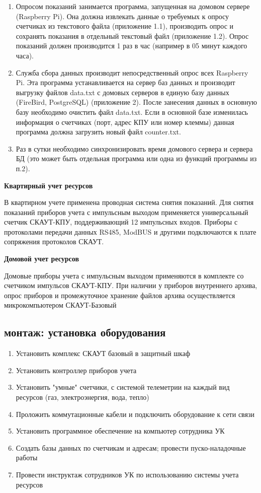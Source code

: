 \begin{enumerate}
	\item Опросом показаний занимается программа, запущенная на домовом сервере (Raspberry Pi).  Она должна извлекать данные о требуемых к опросу счетчиках из текстового файла (приложение 1.1), производить опрос и сохранять показания в отдельный текстовый файл (приложение 1.2). Опрос показаний должен производится 1 раз  в час (например в 05 минут каждого часа).
	\item Служба сбора данных производит непосредственный опрос всех Raspberry Pi. Эта программа устанавливается на сервер баз данных и производит выгрузку файлов data.txt  с домовых серверов в единую базу данных (FireBird, PostgreSQL) (приложение 2). После занесения данных в основную базу необходимо очистить файл data.txt.  Если в основной базе изменилась информация о счетчиках (порт, адрес КПУ или номер клеммы) данная программа должна загрузить новый файл counter.txt.
	\item Раз в сутки необходимо синхронизировать время домового сервера и сервера БД (это может быть отдельная программа или одна из функций программы из п.2).	
\end{enumerate}

\textbf{Квартирный учет ресурсов}

В квартирном учете применена проводная система снятия показаний. Для снятия показаний приборов учета с импульсным выходом применяется универсальный счетчик СКАУТ-КПУ, поддерживающий 12 импульсных входов. Приборы с протоколами передачи данных RS485, ModBUS и другими подключаются к плате сопряжения протоколов СКАУТ.

\textbf{Домовой учет ресурсов}

Домовые приборы учета с импульсным выходом применяются в комплекте со счетчиком импульсов СКАУТ-КПУ. При наличии у приборов внутреннего архива, опрос приборов и промежуточное хранение файлов архива осуществляется микрокомпьютером СКАУТ-Базовый

\subsection{монтаж: установка оборудования}

\begin{enumerate}
	\item Установить комплекс СКАУТ базовый в защитный шкаф
	\item Установить контроллер приборов учета
	\item Установить "умные" счетчики, с системой телеметрии на каждый вид ресурсов (газ, электроэнергия, вода, тепло)
	\item Проложить коммутационные кабели и подключить оборудование к сети связи
	\item Установить программное обеспечение на компьютер сотрудника УК
	\item Создать базы данных по счетчикам и адресам; провести пуско-наладочные работы
	\item Провести инструктаж сотрудников УК по использованию системы учета ресурсов
\end{enumerate}


